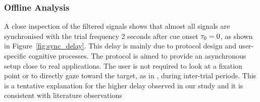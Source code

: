 \subsubsection{Offline Analysis}
\label{sec:offline_analysis}
A close inspection of the filtered signals shows that almost all signals are synchronised with the trial frequency 2 seconds after cue onset $\tau_0 = 0$, as shown in Figure~\ref{fig:sync_delay}.
This delay is mainly due to protocol design and user-specific cognitive processes.
The protocol is aimed to provide an asynchronous setup close to real applications. 
The user is not required to look at a fixation point or to directly gaze toward the target, as in \citep{kimura_ssvep-based_2013, nakanishi_high-speed_2014}, during inter-trial periods.
This is a tentative explanation for the higher delay observed in our study and it is consistent with literature observations \citep{vialatte_steady-state_2010, bakardjian_optimization_2010}

